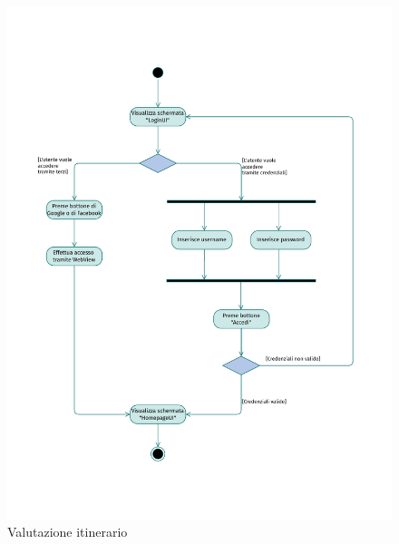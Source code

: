 \documentclass{natourDoc}
\begin{document}
\newpage
\begin{figure}[!htbp]
	\centering
	\includegraphics[width=\textwidth, page=11]{./diagrams/activity.pdf}
	\caption{Valutazione itinerario}
\end{figure}
\FloatBarrier
\end{document}
